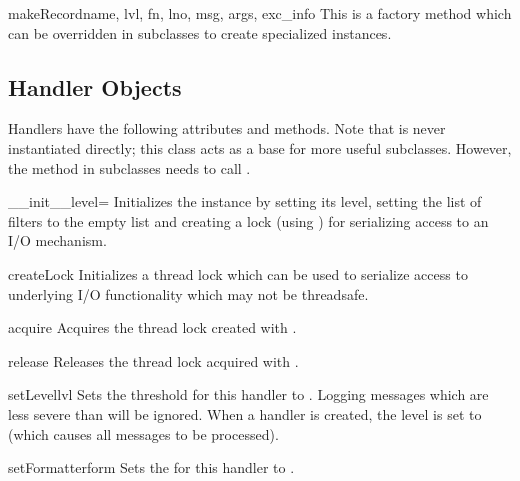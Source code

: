 \begin{methoddesc}{makeRecord}{name, lvl, fn, lno, msg, args, exc_info}
This is a factory method which can be overridden in subclasses to create
specialized  instances.
\end{methoddesc}

\subsection{Handler Objects}

Handlers have the following attributes and methods. Note that
 is never instantiated directly; this class acts as a
base for more useful subclasses. However, the 
method in subclasses needs to call .

\begin{methoddesc}{__init__}{level=}
Initializes the  instance by setting its level, setting
the list of filters to the empty list and creating a lock (using
) for serializing access to an I/O mechanism.
\end{methoddesc}

\begin{methoddesc}{createLock}{}
Initializes a thread lock which can be used to serialize access to
underlying I/O functionality which may not be threadsafe.
\end{methoddesc}

\begin{methoddesc}{acquire}{}
Acquires the thread lock created with .
\end{methoddesc}

\begin{methoddesc}{release}{}
Releases the thread lock acquired with .
\end{methoddesc}

\begin{methoddesc}{setLevel}{lvl}
Sets the threshold for this handler to . Logging messages which are
less severe than  will be ignored. When a handler is created, the
level is set to  (which causes all messages to be processed).
\end{methoddesc}

\begin{methoddesc}{setFormatter}{form}
Sets the  for this handler to .
\end{methoddesc}

